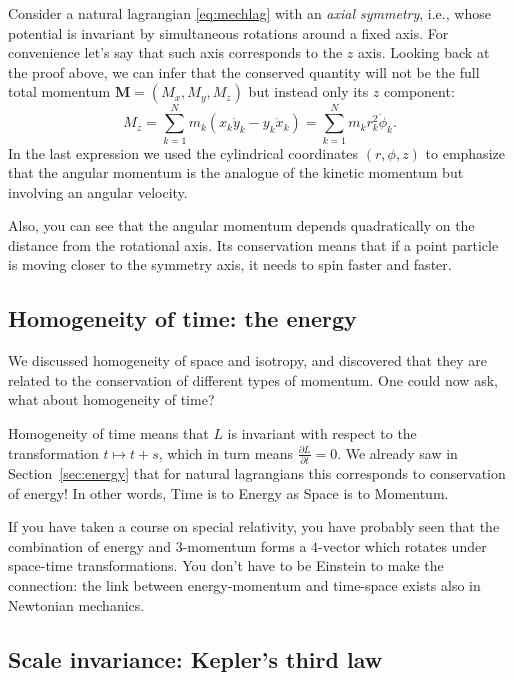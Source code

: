 \documentclass[english,fontsize=11pt,paper=a5,oneside]{scrbook}
\theoremstyle{definition}
\newenvironment{example}
  {\pushQED{\qed}\renewcommand{\qedsymbol}{$\lozenge$}\examplex}
  {\popQED\endexamplex}
\begin{document}
\begin{example}
  Consider a natural lagrangian \eqref{eq:mechlag} with an \emph{axial symmetry}, i.e., whose potential is invariant by simultaneous rotations around a fixed axis.
  For convenience let's say that such axis corresponds to the $z$ axis.
  Looking back at the proof above, we can infer that the conserved quantity will not be the full total momentum $\bm{M} = (M_x, M_y, M_z)$ but instead only its $z$ component:
  \begin{equation}
    M_z = \sum_{k=1}^N m_k\left(x_k \dot y_k - y_k \dot x_k\right) =
    \sum_{k=1}^N m_k r_k^2 \dot \phi_k.
  \end{equation}
  In the last expression we used the cylindrical coordinates $(r, \phi, z)$ to emphasize that the angular momentum is the analogue of the kinetic momentum but involving an angular velocity.

  Also, you can see that the angular momentum depends quadratically on the distance from the rotational axis. Its conservation means that if a point particle is moving closer to the symmetry axis, it needs to spin faster and faster.
\end{example}

\subsection{Homogeneity of time: the energy}

We discussed homogeneity of space and isotropy, and discovered that they are related to the conservation of different types of momentum.
One could now ask, what about homogeneity of time?

Homogeneity of time means that $L$ is invariant with respect to the transformation $t\mapsto t+s$, which in turn means $\frac{\partial L}{\partial t} = 0$. We already saw in Section~\ref{sec:energy} that for natural lagrangians this corresponds to conservation of energy! In other words, Time is to Energy as Space is to Momentum.

If you have taken a course on special relativity, you have probably seen that the combination of energy and $3$-momentum forms a $4$-vector which rotates under space-time transformations. You don't have to be Einstein to make the connection: the link between energy-momentum and time-space exists also in Newtonian mechanics.

\subsection{Scale invariance: Kepler's third law}
\end{document}
